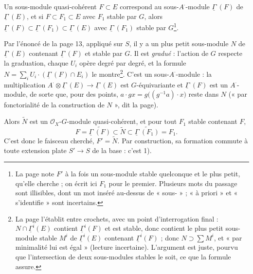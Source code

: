 \documentclass[11pt,a4paper]{article}
\begin{document}
Un sous-module quasi-cohérent $F \subset E$ correspond au sous-$A^{\cdot}$-module
$\underline{\Gamma}^{\cdot}(F)$ de $\underline{\Gamma}^{\cdot}(E)$, et si
$F \subset F_1 \subset E$ avec $F_1$ stable par $G$, alors
$\underline{\Gamma}^{\cdot}(F) \subset \underline{\Gamma}^{\cdot}(F_1)
\subset \underline{\Gamma}^{\cdot}(E)$ avec $\underline{\Gamma}^{\cdot}(F_1)$
stable par $G$\footnote{La page note $F'$ à la fois un sous-module stable
quelconque et le plus petit, qu'elle cherche ; on écrit ici $F_1$ pour le
premier. Plusieurs mots du passage sont illisibles, dont un mot inséré
au-dessus de « sous- » ; « à priori » et « s'identifie » sont incertains.}.

Par l'énoncé de la page 13, appliqué sur $S$, il y a un plus petit
sous-module $N$ de $\underline{\Gamma}^{\cdot}(E)$ contenant
$\underline{\Gamma}^{\cdot}(F)$ et stable par $G$. Il est \emph{gradué} :
l'action de $G$ respecte la graduation, chaque $U_i$ opère degré par degré,
et la formule $N = \sum_i U_i \cdot (\underline{\Gamma}^{\cdot}(F) \cap E_i)$
le montre\footnote{La page l'établit entre crochets, avec un point
d'interrogation final : $N \cap \underline{\Gamma}^{i}(E)$ contient
$\underline{\Gamma}^{i}(F)$ et est stable, donc contient le plus petit
sous-module stable $M^{i}$ de $\underline{\Gamma}^{i}(E)$ contenant
$\underline{\Gamma}^{i}(F)$ ; donc $N \supset \sum M^{i}$, et « par
minimalité lui est égal » (lecture incertaine). L'argument est juste,
pourvu que l'intersection de deux sous-modules stables le soit, ce que la
formule assure.}. C'est un sous-$A^{\cdot}$-module : la multiplication
$A^{\cdot} \otimes \underline{\Gamma}^{\cdot}(E) \to
\underline{\Gamma}^{\cdot}(E)$ est $G$-équivariante et
$\underline{\Gamma}^{\cdot}(F)$ est un $A^{\cdot}$-module, de sorte que,
pour des points, $a \cdot g x = g\bigl((g^{-1}a) \cdot x\bigr)$ reste dans
$N$ (« par fonctorialité de la construction de $N$ », dit la page).

Alors $\widetilde{N}$ est un $\mathcal{O}_X$-$G$-module quasi-cohérent, et
pour tout $F_1$ stable contenant $F$,
\[
  F = \widetilde{\underline{\Gamma}^{\cdot}(F)} \subset \widetilde{N}
  \subset \widetilde{\underline{\Gamma}^{\cdot}(F_1)} = F_1 .
\]
C'est donc le faisceau cherché, $F' = \widetilde{N}$. Par construction, sa
formation commute à toute extension plate $S' \to S$ de la base : c'est 1).
\end{document}
